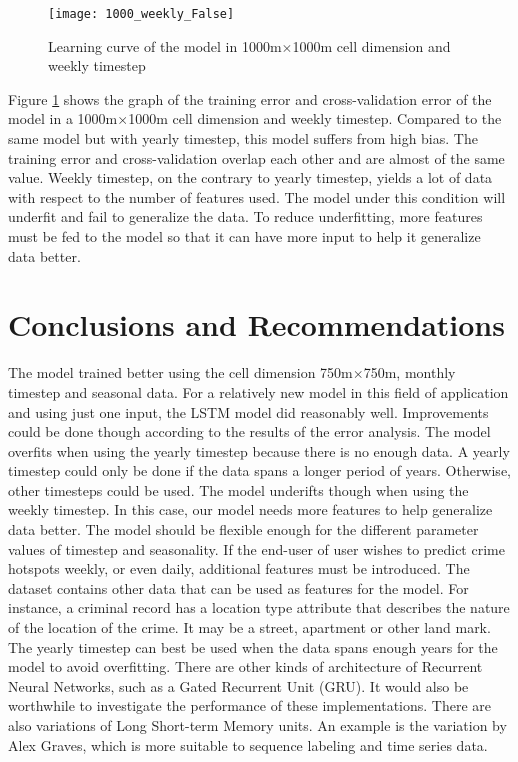 \documentclass[a0]{sciposter}
\begin{document}
\begin{multicols}{2}
    \begin{figure}
      \centering
      \texttt{[image: 1000\_weekly\_False]}
      \caption{Learning curve of the model in 1000m\(\times\)1000m cell dimension and weekly timestep}
      \label{fig:learning-curve2}
    \end{figure}

    Figure \ref{fig:learning-curve2} shows the graph of the training error and cross-validation error of the model in a 1000m\(\times\)1000m cell dimension and weekly timestep. Compared to the same model but with yearly timestep, this model suffers from high bias. The training error and cross-validation overlap each other and are almost of the same value. Weekly timestep, on the contrary to yearly timestep, yields a lot of data with respect to the number of features used. The model under this condition will underfit and fail to generalize the data. To reduce underfitting, more features must be fed to the model so that it can have more input to help it generalize data better.

    \section {Conclusions and Recommendations}
    The model trained better using the cell dimension 750m\(\times\)750m, monthly timestep and seasonal data. For a relatively new model in this field of application and using just one input, the LSTM model did reasonably well. Improvements could be done though according to the results of the error analysis. The model overfits when using the yearly timestep because there is no enough data. A yearly timestep could only be done if the data spans a longer period of years. Otherwise, other timesteps could be used. The model underifts though when using the weekly timestep. In this case, our model needs more features to help generalize data better. The model should be flexible enough for the different parameter values of timestep and seasonality. If the end-user of user wishes to predict crime hotspots weekly, or even daily, additional features must be introduced. The dataset contains other data that can be used as features for the model. For instance, a criminal record has a location type attribute that describes the nature of the location of the crime. It may be a street, apartment or other land mark. The yearly timestep can best be used when the data spans enough years for the model to avoid overfitting. There are other kinds of architecture of Recurrent Neural Networks, such as a Gated Recurrent Unit (GRU). It would also be worthwhile to investigate the performance of these implementations. There are also variations of Long Short-term Memory units. An example is the variation by Alex Graves, which is more suitable to sequence labeling and time series data.

    \end{multicols}
\end{document}
